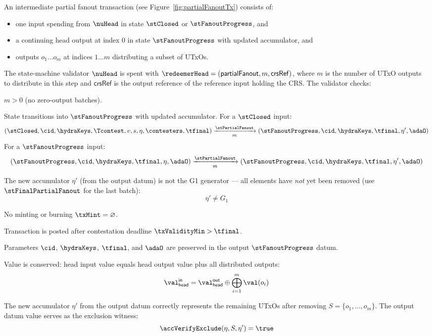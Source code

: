 An intermediate partial fanout transaction (see Figure~\ref{fig:partialFanoutTx}) consists of:
\begin{itemize}
  \item one input spending from $\nuHead$ in state $\stClosed$ or $\stFanoutProgress$, and
  \item a continuing head output at index 0 in state $\stFanoutProgress$ with updated accumulator, and
  \item outputs $o_{1} \dots o_{m}$ at indices $1 \dots m$ distributing a subset of UTxOs.
\end{itemize}

\noindent The state-machine validator $\nuHead$ is spent with
$\redeemerHead = (\mathsf{partialFanout}, m, \mathsf{crsRef})$, where $m$ is the number of UTxO outputs to distribute in this step and $\mathsf{crsRef}$ is the output reference of the reference input holding the CRS.
The validator checks:
\begin{menumerate}
  \item $m > 0$ (no zero-output batches).
  \item State transitions into $\stFanoutProgress$ with updated accumulator. For a $\stClosed$ input:
  \[
	(\stClosed,\cid,\hydraKeys,\Tcontest,v,s,\eta,\contesters,\tfinal) \xrightarrow[m]{\stPartialFanout} (\stFanoutProgress,\cid,\hydraKeys,\tfinal,\eta',\adaO)
  \]
  For a $\stFanoutProgress$ input:
  \[
	(\stFanoutProgress,\cid,\hydraKeys,\tfinal,\eta,\adaO) \xrightarrow[m]{\stPartialFanout} (\stFanoutProgress,\cid,\hydraKeys,\tfinal,\eta',\adaO)
  \]
  \item The new accumulator $\eta'$ (from the output datum) is not the G1 generator — all elements have \emph{not} yet been removed (use $\stFinalPartialFanout$ for the last batch):
  \[
    \eta' \neq G_1
  \]
  \item No minting or burning $\txMint = \varnothing$.
  \item Transaction is posted after contestation deadline $\txValidityMin > \tfinal$.
  \item Parameters $\cid$, $\hydraKeys$, $\tfinal$, and $\adaO$ are preserved in the output $\stFanoutProgress$ datum.
  \item Value is conserved: head input value equals head output value plus all distributed outputs:
  \[
    \val_{\mathsf{head}}^{\mathsf{in}} = \val_{\mathsf{head}}^{\mathsf{out}} \oplus \bigoplus_{i=1}^{m} \val(o_i)
  \]
  \item The new accumulator $\eta'$ from the output datum correctly represents the remaining UTxOs after removing $S = \{o_1, \ldots, o_m\}$. The output datum value serves as the exclusion witness:
  \[
	\accVerifyExclude(\eta, S, \eta') = \true
  \]
\end{menumerate}

